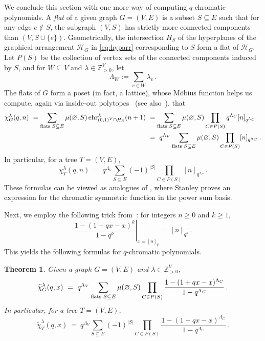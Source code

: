 \documentclass[11pt]{amsart}
\newtheorem{theorem}{Theorem} %
\newcommand\ehr{\operatorname{ehr}}
\newcommand\ZZ{\mathbb{Z}}
\begin{document}
We conclude this section with one more way of computing $q$-chromatic polynomials.
A \emph{flat} of a given graph $G = (V, E)$ is a subset $S \subseteq E$ such that for any edge $e\notin S$, the subgraph $(V,S)$ has strictly more connected components than $(V,S\cup\{e\})$. 
Geometrically, the intersection $H_S$ of the hyperplanes of the graphical arrangement $\mathcal{H}_G$ in \eqref{eq:hyparr} corresponding to $S$ form a flat of $\mathcal{H}_G$.
Let $P(S)$ be the collection of vertex sets of the connected components induced by $S$, and
for $W \subseteq V$ and $\lambda \in \ZZ_{ > 0 }^V$, let
\[
  \Lambda_W := \sum_{ v \in W } \lambda_v \, .
\]
The flats of $G$ form a poset (in fact, a lattice), whose M\"obius function helps us compute, again via inside-out polytopes~\cite{iop} (see also~\cite[Chapter~7]{CRT}), that
\begin{align*}
\chi^\lambda_G(q,n)
 \ = \sum_{\text{flats }S\subseteq E}\mu(\varnothing,S) \ehr^\lambda_{(0,1)^V \cap H_S} (n+1)
 \ &= \sum_{\text{flats }S\subseteq E}\mu(\varnothing,S) \prod_{C \in P(S)} q^{\Lambda_C}
[n]_{q^{\Lambda_C}} \\
   &= \ q^{ \Lambda_V } \sum_{\text{\rm flats }S\subseteq E}\mu(\varnothing,S) \prod_{C \in P(S)} [n]_{q^{\Lambda_C}} \, .
\end{align*}
In particular, for a tree $T=(V,E)$,
\[
\chi^\lambda_T(q,n) \ = \ q^{ \Lambda_V } \sum_{S\subseteq E}(-1)^{|S|} \prod_{ C \in P(S) } [n]_{q^{\Lambda_C}} \, .
\]
These formulas can be viewed as analogues of \cite[Theorem~2.5]{StanleyChromatic}, where Stanley proves an expression for the chromatic symmetric function in the power sum basis.

Next, we employ the following trick from~\cite{Chapoton}: for integers $n \ge 0$ and $k \ge 1$,
\[
  \left. \frac{1-(1+qx-x)^k}{1-q^k} \right|_{ x = [n]_q } = \ [n]_{ q^k } \, .
\]
This yields the following formulas for $q$-chromatic polynomials.

\begin{theorem}\label{thm:mobiusformula}
Given a graph $G=(V,E)$ and $\lambda \in \ZZ_{>0}^V$,
\[
\widetilde\chi^\lambda_G(q,x) \ = \ q^{ \Lambda_V } \sum_{\text{\rm flats }S\subseteq E}\mu(\varnothing,S) \prod_{C \in P(S)} \frac{1-(1+qx-x)^{\Lambda_C}}{1-q^{\Lambda_C}} \, . 
\]
In particular, for a tree $T=(V,E)$,
\[
\widetilde\chi^\lambda_T(q,x) \ = \ q^{ \Lambda_V } \sum_{S\subseteq E}(-1)^{|S|} \prod_{C \in P(S)} \frac{1-(1+qx-x)^{\Lambda_C}}{1-q^{\Lambda_C}} \, . 
\] 
\end{theorem}
\end{document}
